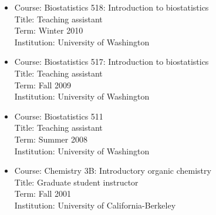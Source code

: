 \begin{itemize}
Title: Lecturer student assistant (Instructor of record)\\
Term: Summer 2015\\
Institution: University of Wisconsin-Madison
\item Course: Biostatistics 518: Introduction to biostatistics\\
Title: Teaching assistant\\
Term: Winter 2010\\
Institution: University of Washington
\item Course: Biostatistics 517: Introduction to biostatistics\\
Title: Teaching assistant\\
Term: Fall 2009\\
Institution: University of Washington
\item Course: Biostatistics 511\\
Title: Teaching assistant\\
Term: Summer 2008\\
Institution: University of Washington
\item Course: Chemistry 3B: Introductory organic chemistry\\
Title: Graduate student instructor\\
Term: Fall 2001\\
Institution: University of California-Berkeley
\end{itemize}

